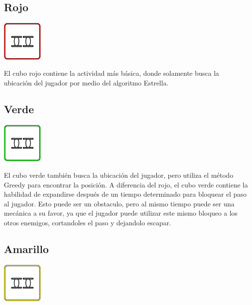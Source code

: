 \documentclass{article}
\begin{document}


\subsection{Rojo}

\includegraphics[width = 20mm]{_enem-rojo.png}

El cubo rojo contiene la actividad más básica, donde solamente busca la ubicación del jugador por medio del algoritmo Estrella.



\subsection{Verde}

\includegraphics[width = 20mm]{_enem-verde.png}


El cubo verde también busca la ubicación del jugador, pero utiliza el método Greedy para encontrar la posición.
A diferencia del rojo, el cubo verde contiene la habilidad de expandirse después de un tiempo determinado para bloquear
el paso al jugador. Esto puede ser un obstaculo, pero al mismo tiempo puede ser una mecánica a su favor, ya que
el jugador puede utilizar este mismo bloqueo a los otros enemigos, cortandoles el paso y dejandolo escapar.





\subsection{Amarillo}

\includegraphics[width = 20mm]{_enem-amarillo.png}
\end{document}
